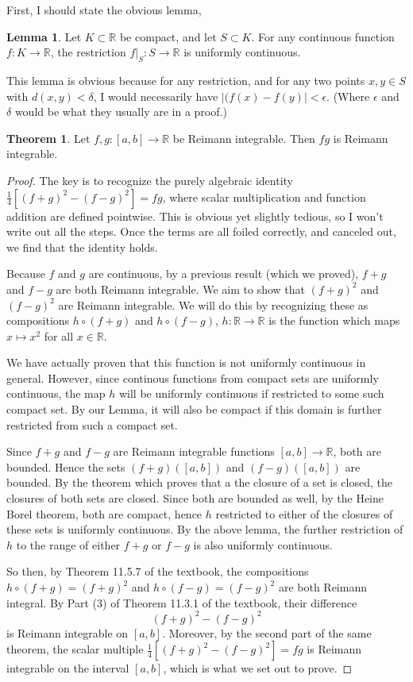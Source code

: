 \documentclass[12pt]{article}
\newcommand{\R}{\mathbb{R}}
\theoremstyle{definition}
\newtheorem{theorem}{Theorem}
\newtheorem{lemma}{Lemma}
\begin{document}
First, I should state the obvious lemma,

\begin{lemma}
    Let $K\subset \R$ be compact, and let $S\subset K$. For any continuous function $f:K\to \R$, the restriction $f|_S:S\to \R$ is uniformly continuous.
\end{lemma}

This lemma is obvious because for any restriction, and for any two points $x, y\in S$ with $d(x,y) < \delta$, I would necessarily have $|(f(x)- f(y)| < \epsilon$. (Where $\epsilon$ and $\delta$ would be what they usually are in a proof.)

\begin{theorem}
    Let $f,g:[a,b]\to \R$ be Reimann integrable. Then $fg$ is Reimann integrable. 
\end{theorem}

\begin{proof}
    The key is to recognize the purely algebraic identity $ \frac{1}{4}[(f + g)^2 - (f - g)^2] = fg $, where scalar multiplication and function addition are defined pointwise. This is obvious yet slightly tedious, so I won't write out all the steps. Once the terms are all foiled correctly, and canceled out, we find that the identity holds. 

    Because $f $ and $g$ are continuous, by a previous result (which we proved), $f + g$ and $f - g$ are both Reimann integrable. We aim to show that $ (f + g)^2 $ and $ (f - g)^2 $ are Reimann integrable. We will do this by recognizing these as compositions $h\circ (f+g)$ and $h\circ (f - g)$, $h:\R\to \R$ is the function which maps $x\mapsto x^2$ for all $x\in \R$. 

    We have actually proven that this function is not uniformly continuous in general. However, since continous functions from compact sets are uniformly continuous, the map $h$ will be uniformly continuous if restricted to some such compact set. By our Lemma, it will also be compact if this domain is further restricted from such a compact set. 

    Since $f + g$ and $f - g$ are Reimann integrable functions $[a,b]\to \R$, both are bounded. Hence the sets $ (f + g)([a,b])$ and $ (f - g)([a,b]) $ are bounded. By the theorem which proves that a the closure of a set is closed, the closures of both sets are closed. Since both are bounded as well, by the Heine Borel theorem, both are compact, hence $h$ restricted to either of the closures of these sets is uniformly continuous. By the above lemma, the further restriction of $h$ to the range of either $f + g$ or $f - g$ is also uniformly continuous. 

    So then, by Theorem 11.5.7 of the textbook, the compositions $h\circ (f + g) = (f + g)^2$ and $ h\circ (f -g) = (f - g)^2$ are both Reimann integral. By Part (3) of Theorem 11.3.1 of the textbook, their difference 
    \[
        (f + g)^2 - (f - g)^2
        \]
    is Reimann integrable on $[a,b]$. 
    Moreover, by the second part of the same theorem, the scalar multiple $\frac{1}{4}[(f + g)^2 - (f - g)^2] = fg$ is Reimann integrable on the interval $[a,b]$, which is what we set out to prove.
\end{proof}
\end{document}
